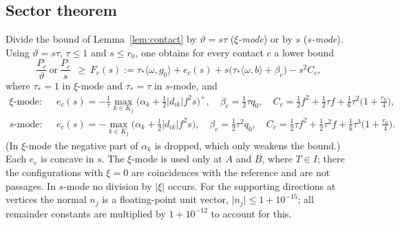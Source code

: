 \documentclass[11pt]{amsart}
\theoremstyle{definition}
\newcommand{\ip}[2]{\langle #1,#2\rangle}
\newcommand{\abs}[1]{\lvert #1\rvert}
\begin{document}
\subsection{Sector theorem}
Divide the bound of Lemma~\ref{lem:contact} by $\vartheta=s\tau$ (\emph{$\xi$-mode}) or by $s$ (\emph{$s$-mode}). Using
$\vartheta=s\tau$, $\tau\le1$ and $s\le r_0$, one obtains for every contact $c$ a lower bound
\begin{equation}\label{eq:sectorbound}
\frac{P_c}{\vartheta}\ \text{or}\ \frac{P_c}{s}\ \ \ge\ F_c(s):=\tau_\ast\ip\omega{g_0}+e_c(s)+s\bigl(\tau_\ast\ip\omega{b}+\beta_c\bigr)-s^2C_c ,
\end{equation}
where $\tau_\ast=1$ in $\xi$-mode and $\tau_\ast=\tau$ in $s$-mode, and
\begin{align*}
\xi\text{-mode:}\quad& e_c(s)=-\tfrac1\tau\max_{k\in K_j}\bigl(\alpha_k+\tfrac12\abs{d_{ik}}f^2s\bigr)^{+},\quad
\beta_c=\tfrac12\tau q_0,\quad C_c=\tfrac12f^2+\tfrac12\tau f+\tfrac16\tau^2\bigl(1+\tfrac{r_0}4\bigr),\\
s\text{-mode:}\quad& e_c(s)=-\max_{k\in K_j}\bigl(\alpha_k+\tfrac12\abs{d_{ik}}f^2s\bigr),\quad
\beta_c=\tfrac12\tau^2q_0,\quad C_c=\tfrac12\tau f^2+\tfrac12\tau^2 f+\tfrac16\tau^3\bigl(1+\tfrac{r_0}4\bigr).
\end{align*}
(In $\xi$-mode the negative part of $\alpha_k$ is dropped, which only weakens the bound.) Each $e_c$ is concave in $s$.
The $\xi$-mode is used only at $A$ and $B$, where $T\in I$; there the configurations with $\xi=0$ are coincidences with
the reference and are not passages. In $s$-mode no
division by $\abs\xi$ occurs. For the supporting directions at vertices the normal $n_j$ is a floating-point unit vector,
$\abs{n_j}\le1+10^{-15}$; all remainder constants are multiplied by $1+10^{-12}$ to account for this.
\end{document}
